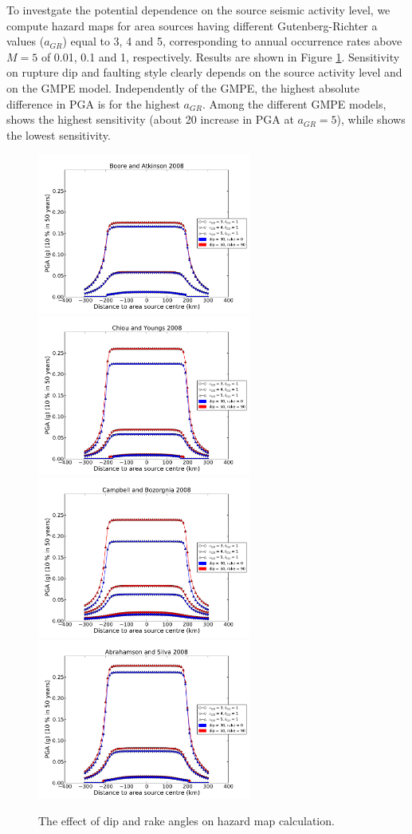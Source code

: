 To investgate the potential dependence on the source seismic activity level, we compute hazard maps for
area sources having different Gutenberg-Richter a values ($a_{GR}$) equal to 3, 4 and 5, corresponding to
annual occurrence rates above $M=5$ of 0.01, 0.1 and 1, respectively. Results are shown in Figure \ref{fig:dip_rake_area}. Sensitivity on rupture dip and faulting style clearly depends on the source activity level and on the GMPE model. Independently of the GMPE, the highest absolute difference in PGA is for the highest $a_{GR}$. Among the different GMPE models, \cite{campbell2008} shows the highest sensitivity (about 20 %
increase in PGA at $a_{GR}=5$), while \cite{boore2008} shows the lowest sensitivity.
\begin{figure}
\centering
\includegraphics[width=7cm]{./Pictures/PGA_0pt1_BA2008_dip_rake.pdf}
\includegraphics[width=7cm]{./Pictures/PGA_0pt1_CY2008_dip_rake.pdf}
\includegraphics[width=7cm]{./Pictures/PGA_0pt1_CB2008_dip_rake.pdf}
\includegraphics[width=7cm]{./Pictures/PGA_0pt1_AS2008_dip_rake.pdf}
\caption{The effect of dip and rake angles on hazard map calculation.}
\label{fig:dip_rake_area}
\end{figure}

